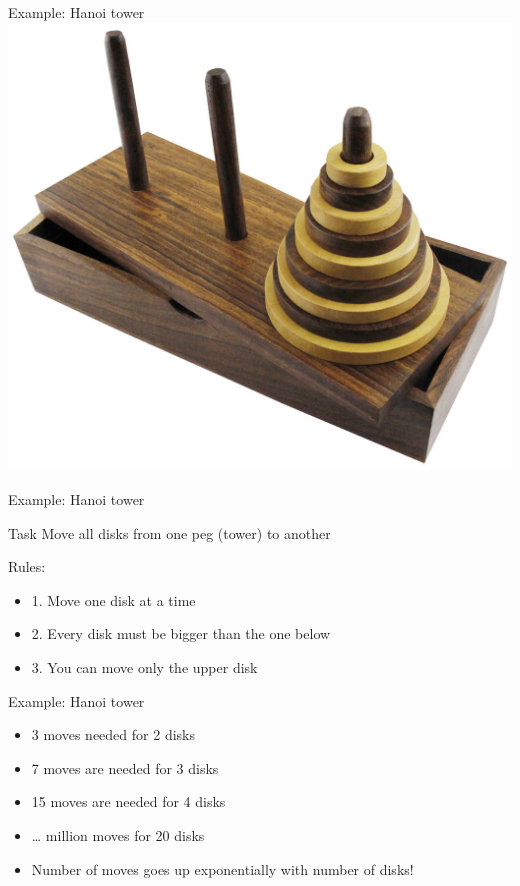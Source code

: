 \documentclass[presentation]{beamer}
\begin{document}
\begin{frame}[label=sec-2-4]{Example: Hanoi tower}
\includegraphics[width=.9\linewidth]{./img/tower_hanoi2.jpg}
\end{frame}
\begin{frame}[label=sec-2-5]{Example: Hanoi tower}
\begin{block}{Task}
Move all disks from one peg (tower) to another
\end{block}
\begin{block}{Rules:}
\begin{itemize}
\item 1. Move one disk at a time
\item 2. Every disk must be bigger than the one below
\item 3. You can move only the upper disk
\end{itemize}
\end{block}
\end{frame}
\begin{frame}[label=sec-2-6]{Example: Hanoi tower}
\begin{itemize}
\item 3 moves needed for 2 disks
\item 7 moves are needed for 3 disks
\item 15 moves are needed for 4 disks
\item \ldots{} million moves for 20 disks
\item Number of moves goes up exponentially with number of disks!
\end{itemize}
\end{frame}
\end{document}
